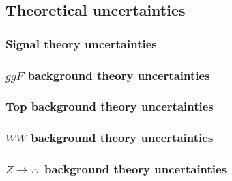 \subsection{Theoretical uncertainties}
\subsubsection{Signal theory uncertainties}
\subsubsection{$ggF$ background theory uncertainties}
\subsubsection{Top background theory uncertainties}
\subsubsection{$WW$ background theory uncertainties}
\subsubsection{$Z\rightarrow\tau\tau$ background theory uncertainties}
